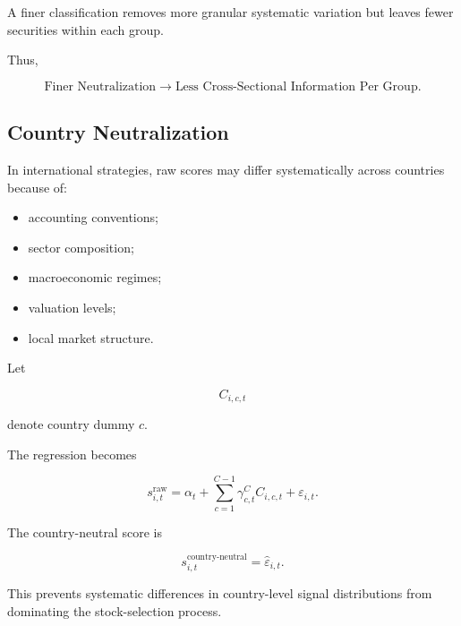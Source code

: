 \documentclass[11pt,a4paper]{article}
\begin{document}
A finer classification removes more granular systematic variation but leaves
fewer securities within each group.

Thus,

\begin{equation}
\boxed{
\text{Finer Neutralization}
\rightarrow
\text{Less Cross-Sectional Information Per Group}.
}
\end{equation}


\subsection{Country Neutralization}
\label{subsec:country_neutralization}

In international strategies, raw scores may differ systematically across
countries because of:

\begin{itemize}
    \item accounting conventions;
    \item sector composition;
    \item macroeconomic regimes;
    \item valuation levels;
    \item local market structure.
\end{itemize}

Let

\begin{equation}
C_{i,c,t}
\end{equation}

denote country dummy $c$.

The regression becomes

\begin{equation}
s_{i,t}^{\mathrm{raw}}
=
\alpha_t
+
\sum_{c=1}^{C-1}
\gamma_{c,t}^{C}
C_{i,c,t}
+
\varepsilon_{i,t}.
\end{equation}

The country-neutral score is

\begin{equation}
\boxed{
s_{i,t}^{\mathrm{country\text{-}neutral}}
=
\widehat{\varepsilon}_{i,t}.
}
\end{equation}

This prevents systematic differences in country-level signal distributions from
dominating the stock-selection process.


\end{document}
